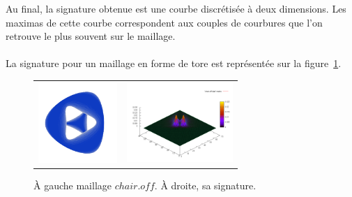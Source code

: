 \documentclass{llncs}
\begin{document}
Au final, la signature obtenue est une courbe discrétisée à deux dimensions. Les maximas de cette courbe correspondent aux couples de courbures que l'on retrouve le plus souvent sur le maillage.
\\\\
La signature pour un maillage en forme de tore est représentée sur la figure~\ref{signature_tore}.
\begin{figure}[tb]
    \centering
    \begin{tabular}{cc}
      \includegraphics[width=3cm]{img/chair.png} &
      \includegraphics[width=4cm]{img/chair_taubin.png} \\
    \end{tabular}
    \caption{\`A gauche maillage $chair.off$. \`A droite, sa signature.}
\label{signature_tore}
\end{figure}
\end{document}
